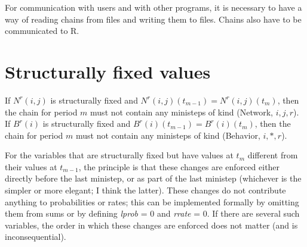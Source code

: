 \documentclass[a4paper,fleqn,12pt]{article}
\begin{document}
For communication with users and with other programs,
it is necessary to have a way of reading chains from files
and writing them to files.
Chains also have to be communicated to R.

\section{Structurally fixed values}

If $N^{r}(i,j)$ is structurally fixed and $N^{r}(i,j)(t_{m-1}) = N^{r}(i,j)(t_m)$,
then the chain for period $m$ must not contain any ministeps of kind (Network, $i,j,r$).\\
If $B^{r}(i)$ is structurally fixed and $B^{r}(i)(t_{m-1}) = B^{r}(i)(t_m)$,
then the chain for period $m$ must not contain any ministeps of kind (Behavior, $i,*,r$).

For the variables that are structurally fixed but
have values at $t_m$ different from their
values at $t_{m-1}$, the principle is that these changes are enforced
either directly before the last ministep, or as part of the last ministep
(whichever is the simpler or more elegant;
I think the latter). These changes
do not contribute anything to probabilities or rates; this can be implemented
formally by omitting them from sums or by defining \textit{lprob} = 0
and \textit{rrate} = 0.
If there are several such variables, the order in which these changes are enforced
does not matter (and is inconsequential).
\end{document}

